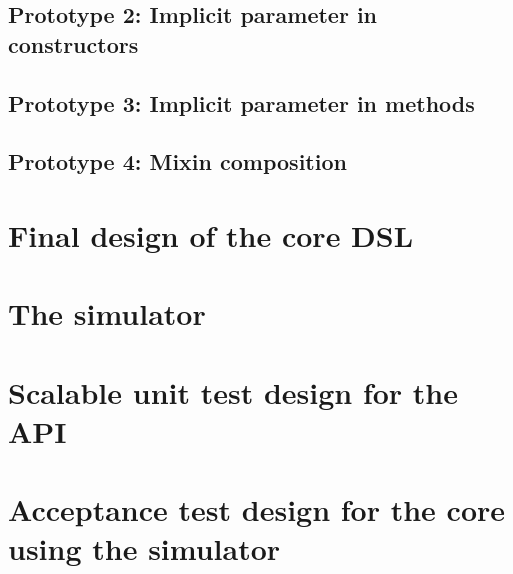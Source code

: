 



\subsection{Prototype 2: Implicit parameter in constructors} \label{chap:design->sec:dsl->subsec:prototype-2-implicit-parameter-in-constructors}

\subsection{Prototype 3: Implicit parameter in methods} \label{chap:design->sec:dsl->subsec:prototype-3-implicit-parameter-in-methods}

\subsection{Prototype 4: Mixin composition} \label{chap:design->sec:dsl->subsec:prototype-4-mixin-composition}

\section{Final design of the core DSL} \label{chap:design->sec:final-dsl}

\section{The simulator}

\section{Scalable unit test design for the API}

\section{Acceptance test design for the core using the simulator}

